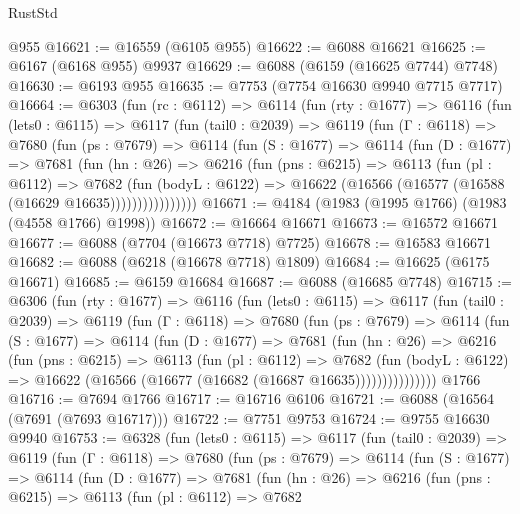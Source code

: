 \begin{lexlean}{RustStd}
\begin{coremodule}
    @955
@16621 := @16559 (@6105 @955)
@16622 := @6088 @16621
@16625 := @6167 (@6168 @955) @9937
@16629 := @6088 (@6159 (@16625 @7744) @7748)
@16630 := @6193 @955
@16635 := @7753 (@7754 @16630 @9940 @7715 @7717)
@16664 := @6303
    (fun (rc : @6112) =>
    @6114
      (fun (rty : @1677) =>
      @6116
        (fun (lets0 : @6115) =>
        @6117
          (fun (tail0 : @2039) =>
          @6119
            (fun (Γ : @6118) =>
            @7680
              (fun (ps : @7679) =>
              @6114
                (fun (S : @1677) =>
                @6114
                  (fun (D : @1677) =>
                  @7681
                    (fun (hn : @26) =>
                    @6216
                      (fun (pns : @6215) =>
                      @6113
                        (fun (pl : @6112) =>
                        @7682
                          (fun (bodyL : @6122) =>
                          @16622 (@16566 (@16577 (@16588 (@16629 @16635))))))))))))))))
@16671 := @4184 (@1983 (@1995 @1766) (@1983 (@4558 @1766) @1998))
@16672 := @16664 @16671
@16673 := @16572 @16671
@16677 := @6088 (@7704 (@16673 @7718) @7725)
@16678 := @16583 @16671
@16682 := @6088 (@6218 (@16678 @7718) @1809)
@16684 := @16625 (@6175 @16671)
@16685 := @6159 @16684
@16687 := @6088 (@16685 @7748)
@16715 := @6306
    (fun (rty : @1677) =>
    @6116
      (fun (lets0 : @6115) =>
      @6117
        (fun (tail0 : @2039) =>
        @6119
          (fun (Γ : @6118) =>
          @7680
            (fun (ps : @7679) =>
            @6114
              (fun (S : @1677) =>
              @6114
                (fun (D : @1677) =>
                @7681
                  (fun (hn : @26) =>
                  @6216
                    (fun (pns : @6215) =>
                    @6113
                      (fun (pl : @6112) =>
                      @7682
                        (fun (bodyL : @6122) =>
                        @16622 (@16566 (@16677 (@16682 (@16687 @16635)))))))))))))))
    @1766
@16716 := @7694 @1766
@16717 := @16716 @6106
@16721 := @6088 (@16564 (@7691 (@7693 @16717)))
@16722 := @7751 @9753
@16724 := @9755 @16630 @9940
@16753 := @6328
    (fun (lets0 : @6115) =>
    @6117
      (fun (tail0 : @2039) =>
      @6119
        (fun (Γ : @6118) =>
        @7680
          (fun (ps : @7679) =>
          @6114
            (fun (S : @1677) =>
            @6114
              (fun (D : @1677) =>
              @7681
                (fun (hn : @26) =>
                @6216
                  (fun (pns : @6215) =>
                  @6113
                    (fun (pl : @6112) =>
                    @7682

\end{coremodule}
\end{lexlean}
